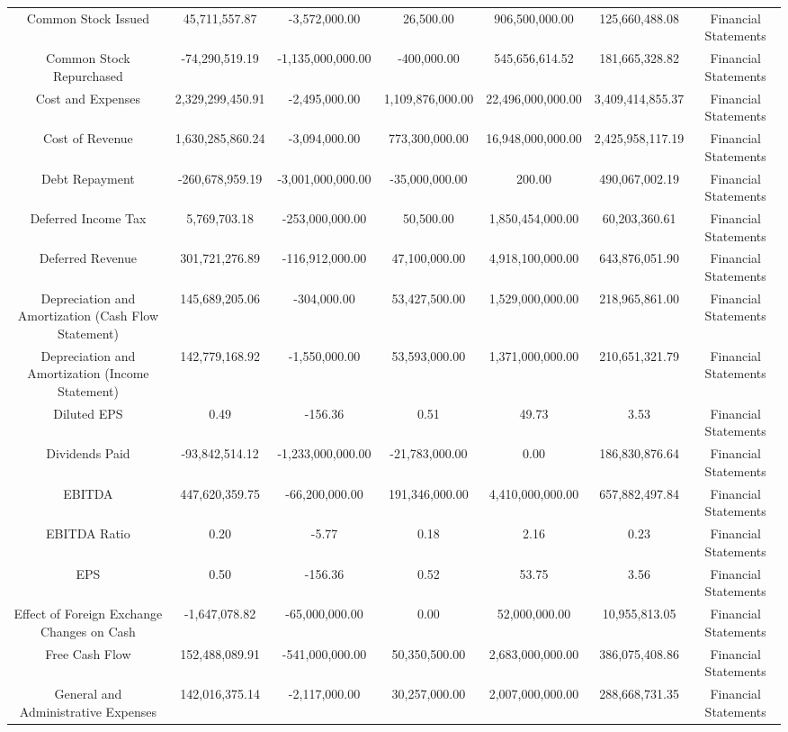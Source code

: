 \begin{longtable}{ccccccc}
Common Stock Issued & 45,711,557.87 & -3,572,000.00 & 26,500.00 & 906,500,000.00 & 125,660,488.08 & Financial Statements \\
Common Stock Repurchased & -74,290,519.19 & -1,135,000,000.00 & -400,000.00 & 545,656,614.52 & 181,665,328.82 & Financial Statements \\
Cost and Expenses & 2,329,299,450.91 & -2,495,000.00 & 1,109,876,000.00 & 22,496,000,000.00 & 3,409,414,855.37 & Financial Statements \\
Cost of Revenue & 1,630,285,860.24 & -3,094,000.00 & 773,300,000.00 & 16,948,000,000.00 & 2,425,958,117.19 & Financial Statements \\
Debt Repayment & -260,678,959.19 & -3,001,000,000.00 & -35,000,000.00 & 200.00 & 490,067,002.19 & Financial Statements \\
Deferred Income Tax & 5,769,703.18 & -253,000,000.00 & 50,500.00 & 1,850,454,000.00 & 60,203,360.61 & Financial Statements \\
Deferred Revenue & 301,721,276.89 & -116,912,000.00 & 47,100,000.00 & 4,918,100,000.00 & 643,876,051.90 & Financial Statements \\
Depreciation and Amortization (Cash Flow Statement) & 145,689,205.06 & -304,000.00 & 53,427,500.00 & 1,529,000,000.00 & 218,965,861.00 & Financial Statements \\
Depreciation and Amortization (Income Statement) & 142,779,168.92 & -1,550,000.00 & 53,593,000.00 & 1,371,000,000.00 & 210,651,321.79 & Financial Statements \\
Diluted EPS & 0.49 & -156.36 & 0.51 & 49.73 & 3.53 & Financial Statements \\
Dividends Paid & -93,842,514.12 & -1,233,000,000.00 & -21,783,000.00 & 0.00 & 186,830,876.64 & Financial Statements \\
EBITDA & 447,620,359.75 & -66,200,000.00 & 191,346,000.00 & 4,410,000,000.00 & 657,882,497.84 & Financial Statements \\
EBITDA Ratio & 0.20 & -5.77 & 0.18 & 2.16 & 0.23 & Financial Statements \\
EPS & 0.50 & -156.36 & 0.52 & 53.75 & 3.56 & Financial Statements \\
Effect of Foreign Exchange Changes on Cash & -1,647,078.82 & -65,000,000.00 & 0.00 & 52,000,000.00 & 10,955,813.05 & Financial Statements \\
Free Cash Flow & 152,488,089.91 & -541,000,000.00 & 50,350,500.00 & 2,683,000,000.00 & 386,075,408.86 & Financial Statements \\
General and Administrative Expenses & 142,016,375.14 & -2,117,000.00 & 30,257,000.00 & 2,007,000,000.00 & 288,668,731.35 & Financial Statements \\

\end{longtable}
